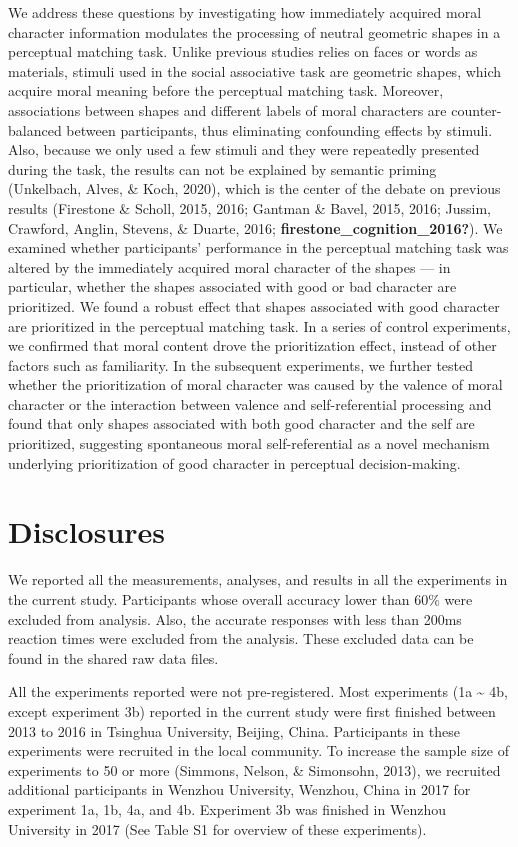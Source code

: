 \documentclass[
  man]{apa6}
\begin{document}
We address these questions by investigating how immediately acquired moral character information modulates the processing of neutral geometric shapes in a perceptual matching task. Unlike previous studies relies on faces or words as materials, stimuli used in the social associative task are geometric shapes, which acquire moral meaning before the perceptual matching task. Moreover, associations between shapes and different labels of moral characters are counter-balanced between participants, thus eliminating confounding effects by stimuli. Also, because we only used a few stimuli and they were repeatedly presented during the task, the results can not be explained by semantic priming (Unkelbach, Alves, \& Koch, 2020), which is the center of the debate on previous results (Firestone \& Scholl, 2015, 2016; Gantman \& Bavel, 2015, 2016; Jussim, Crawford, Anglin, Stevens, \& Duarte, 2016; \textbf{firestone\_cognition\_2016?}). We examined whether participants' performance in the perceptual matching task was altered by the immediately acquired moral character of the shapes --- in particular, whether the shapes associated with good or bad character are prioritized. We found a robust effect that shapes associated with good character are prioritized in the perceptual matching task. In a series of control experiments, we confirmed that moral content drove the prioritization effect, instead of other factors such as familiarity. In the subsequent experiments, we further tested whether the prioritization of moral character was caused by the valence of moral character or the interaction between valence and self-referential processing and found that only shapes associated with both good character and the self are prioritized, suggesting spontaneous moral self-referential as a novel mechanism underlying prioritization of good character in perceptual decision-making.

\hypertarget{disclosures}{%
\section{Disclosures}\label{disclosures}}

We reported all the measurements, analyses, and results in all the experiments in the current study. Participants whose overall accuracy lower than 60\% were excluded from analysis. Also, the accurate responses with less than 200ms reaction times were excluded from the analysis. These excluded data can be found in the shared raw data files.

All the experiments reported were not pre-registered. Most experiments (1a \textasciitilde{} 4b, except experiment 3b) reported in the current study were first finished between 2013 to 2016 in Tsinghua University, Beijing, China. Participants in these experiments were recruited in the local community. To increase the sample size of experiments to 50 or more (Simmons, Nelson, \& Simonsohn, 2013), we recruited additional participants in Wenzhou University, Wenzhou, China in 2017 for experiment 1a, 1b, 4a, and 4b. Experiment 3b was finished in Wenzhou University in 2017 (See Table S1 for overview of these experiments).
\end{document}
